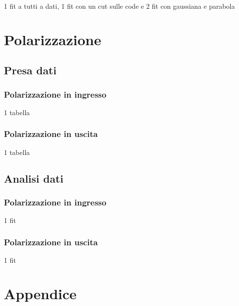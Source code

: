 \documentclass[a4paper]{article}
\begin{document}
1 fit a tutti a dati, 1 fit con un cut sulle code e 2 fit con gaussiana e parabola

\section{Polarizzazione}

\subsection{Presa dati}

\subsubsection{Polarizzazione in ingresso}

1 tabella

\subsubsection{Polarizzazione in uscita}

1 tabella

\subsection{Analisi dati}

\subsubsection{Polarizzazione in ingresso}

1 fit

\subsubsection{Polarizzazione in uscita}

1 fit

\newpage
\section*{Appendice}
	
\end{document}
